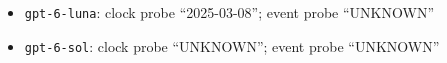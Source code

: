 \begin{itemize}
\item \texttt{gpt-6-luna}: clock probe ``2025-03-08''; event probe ``UNKNOWN''
\item \texttt{gpt-6-sol}: clock probe ``UNKNOWN''; event probe ``UNKNOWN''
\end{itemize}
